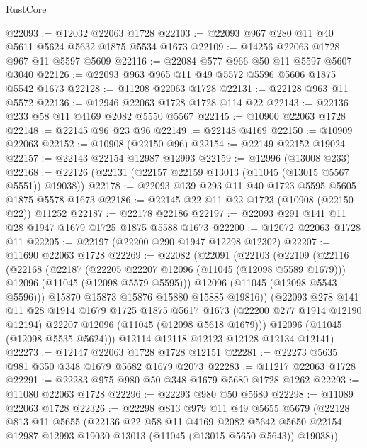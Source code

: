 \begin{lexlean}{RustCore}
\begin{coremodule}
@22093 := @12032 @22063 @1728
@22103 := @22093 @967 @280 @11 @40 @5611 @5624 @5632 @1875 @5534 @1673
@22109 := @14256 @22063 @1728 @967 @11 @5597 @5609
@22116 := @22084 @577 @966 @50 @11 @5597 @5607 @3040
@22126 := @22093 @963 @965 @11 @49 @5572 @5596 @5606 @1875 @5542 @1673
@22128 := @11208 @22063 @1728
@22131 := @22128 @963 @11 @5572
@22136 := @12946 @22063 @1728 @1728 @114 @22
@22143 := @22136 @233 @58 @11 @4169 @2082 @5550 @5567
@22145 := @10900 @22063 @1728
@22148 := @22145 @96 @23 @96
@22149 := @22148 @4169
@22150 := @10909 @22063
@22152 := @10908 (@22150 @96)
@22154 := @22149 @22152 @19024
@22157 := @22143 @22154 @12987 @12993
@22159 := @12996 (@13008 @233)
@22168 := @22126 (@22131 (@22157 @22159 @13013 (@11045 (@13015 @5567 @5551)) @19038))
@22178 := @22093 @139 @293 @11 @40 @1723 @5595 @5605 @1875 @5578 @1673
@22186 := @22145 @22 @11 @22 @1723 (@10908 (@22150 @22)) @11252
@22187 := @22178 @22186
@22197 := @22093 @291 @141 @11 @28 @1947 @1679 @1725 @1875 @5588 @1673
@22200 := @12072 @22063 @1728 @11
@22205 := @22197 (@22200 @290 @1947 @12298 @12302)
@22207 := @11690 @22063 @1728
@22269 := @22082
    (@22091
      (@22103
        (@22109
          (@22116
            (@22168
              (@22187
                (@22205 @22207 @12096 (@11045 (@12098 @5589 @1679)))
                @12096
                (@11045 (@12098 @5579 @5595)))
              @12096
              (@11045 (@12098 @5543 @5596)))
            @15870
            @15873
            @15876
            @15880
            @15885
            @19816))
        (@22093
          @278
          @141
          @11
          @28
          @1914
          @1679
          @1725
          @1875
          @5617
          @1673
          (@22200 @277 @1914 @12190 @12194)
          @22207
          @12096
          (@11045 (@12098 @5618 @1679)))
        @12096
        (@11045 (@12098 @5535 @5624)))
      @12114
      @12118
      @12123
      @12128
      @12134
      @12141)
@22273 := @12147 @22063 @1728 @1728 @12151
@22281 := @22273 @5635 @981 @350 @348 @1679 @5682 @1679 @2073
@22283 := @11217 @22063 @1728
@22291 := @22283 @975 @980 @50 @348 @1679 @5680 @1728 @1262
@22293 := @11080 @22063 @1728
@22296 := @22293 @980 @50 @5680
@22298 := @11089 @22063 @1728
@22326 := @22298
    @813
    @979
    @11
    @49
    @5655
    @5679
    (@22128
      @813
      @11
      @5655
      (@22136
        @22
        @58
        @11
        @4169
        @2082
        @5642
        @5650
        @22154
        @12987
        @12993
        @19030
        @13013
        (@11045 (@13015 @5650 @5643))
        @19038))

\end{coremodule}
\end{lexlean}
